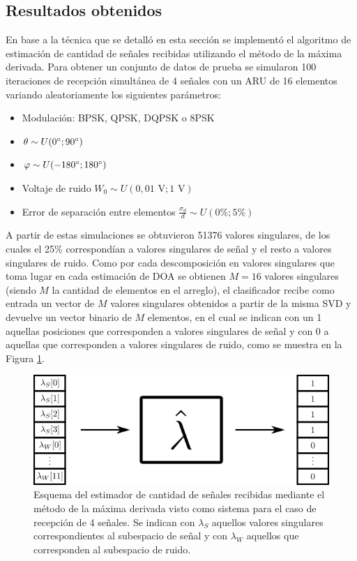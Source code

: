 \subsection{Resultados obtenidos}\label{subc:ml_maxder_resul}
En base a la técnica que se detalló en esta sección se implementó el algoritmo de estimación de cantidad de señales recibidas utilizando el método de la máxima derivada. Para obtener un conjunto de datos de prueba se simularon 100 iteraciones de recepción simultánea de 4 señales con un ARU de 16 elementos variando aleatoriamente los siguientes parámetros:
\begin{itemize}
  \item Modulación: BPSK, QPSK, DQPSK o 8PSK
  \item $\theta \sim U(0^{\circ};90^{\circ})$
  \item $\varphi \sim U(-180^{\circ};180^{\circ})$
  \item Voltaje de ruido $W_0\sim U(0,01 \textrm{ V};1 \textrm{ V})$
  \item Error de separación entre elementos $\frac{\sigma_d}{d} \sim U(0\%;5\%)$
\end{itemize}

A partir de estas simulaciones se obtuvieron 51376 valores singulares, de los cuales el 25\% correspondían a valores singulares de señal y el resto a valores singulares de ruido. Como por cada descomposición en valores singulares que toma lugar en cada estimación de DOA se obtienen $M=16$ valores singulares (siendo $M$ la cantidad de elementos en el arreglo), el clasificador recibe como entrada un vector de $M$ valores singulares obtenidos a partir de la misma SVD y devuelve un vector binario de $M$ elementos, en el cual se indican con un 1 aquellas posiciones que corresponden a valores singulares de señal y con 0 a aquellas que corresponden a valores singulares de ruido, como se muestra en la Figura \ref{fig:ml_maxder_imp}.
\begin{figure}[ht!]
  \centering
  \includegraphics[width=0.7\linewidth]{images/05-Machine Learning/ml_maxder_imp.png}
  \caption{Esquema del estimador de cantidad de señales recibidas mediante el método de la máxima derivada visto como sistema para el caso de recepción de 4 señales. Se indican con $\lambda_S$ aquellos valores singulares correspondientes al subespacio de señal y con $\lambda_W$ aquellos que corresponden al subespacio de ruido.}
  \label{fig:ml_maxder_imp}
\end{figure}

